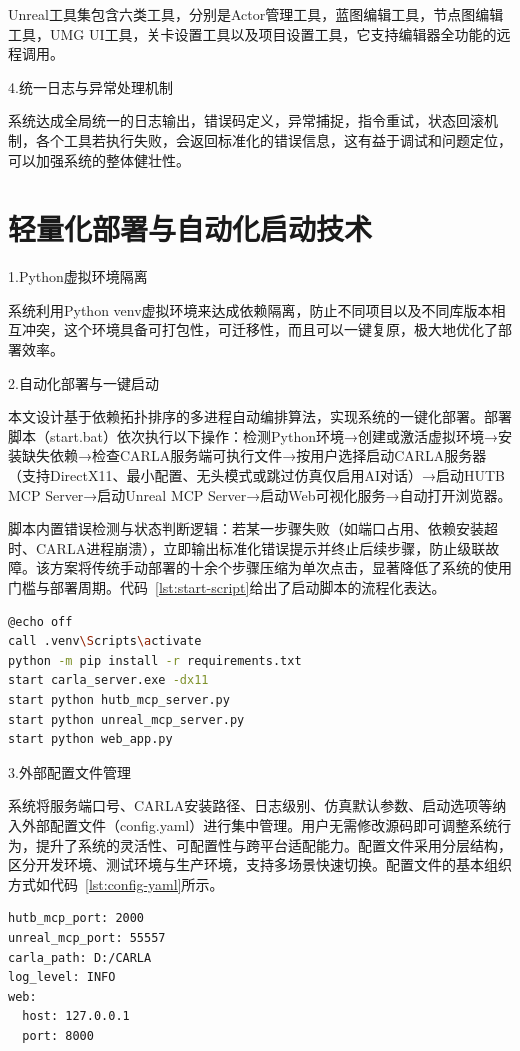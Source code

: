 Unreal工具集包含六类工具，分别是Actor管理工具，蓝图编辑工具，节点图编辑工具，UMG
UI工具，关卡设置工具以及项目设置工具，它支持编辑器全功能的远程调用。

4.统一日志与异常处理机制

系统达成全局统一的日志输出，错误码定义，异常捕捉，指令重试，状态回滚机制，各个工具若执行失败，会返回标准化的错误信息，这有益于调试和问题定位，可以加强系统的整体健壮性。

\section{轻量化部署与自动化启动技术}

1.Python虚拟环境隔离

系统利用Python
venv虚拟环境来达成依赖隔离，防止不同项目以及不同库版本相互冲突，这个环境具备可打包性，可迁移性，而且可以一键复原，极大地优化了部署效率。

2.自动化部署与一键启动

本文设计基于依赖拓扑排序的多进程自动编排算法，实现系统的一键化部署。部署脚本（start.bat）依次执行以下操作：检测Python环境→创建或激活虚拟环境→安装缺失依赖→检查CARLA服务端可执行文件→按用户选择启动CARLA服务器（支持DirectX11、最小配置、无头模式或跳过仿真仅启用AI对话）→启动HUTB
MCP Server→启动Unreal MCP Server→启动Web可视化服务→自动打开浏览器。

脚本内置错误检测与状态判断逻辑：若某一步骤失败（如端口占用、依赖安装超时、CARLA进程崩溃），立即输出标准化错误提示并终止后续步骤，防止级联故障。该方案将传统手动部署的十余个步骤压缩为单次点击，显著降低了系统的使用门槛与部署周期。代码~\ref{lst:start-script}给出了启动脚本的流程化表达。

\begin{lstlisting}[style=hutbcode,language=bash,basicstyle=\ttfamily\tiny,numberstyle=\tiny\color{gray},aboveskip=1pt,belowskip=1pt,framesep=1pt,lineskip=-1pt,caption={一键启动脚本流程示例},label={lst:start-script}]
@echo off
call .venv\Scripts\activate
python -m pip install -r requirements.txt
start carla_server.exe -dx11
start python hutb_mcp_server.py
start python unreal_mcp_server.py
start python web_app.py
\end{lstlisting}

3.外部配置文件管理

系统将服务端口号、CARLA安装路径、日志级别、仿真默认参数、启动选项等纳入外部配置文件（config.yaml）进行集中管理。用户无需修改源码即可调整系统行为，提升了系统的灵活性、可配置性与跨平台适配能力。配置文件采用分层结构，区分开发环境、测试环境与生产环境，支持多场景快速切换。配置文件的基本组织方式如代码~\ref{lst:config-yaml}所示。

\begin{lstlisting}[style=hutbcode,language=bash,basicstyle=\ttfamily\tiny,numberstyle=\tiny\color{gray},aboveskip=1pt,belowskip=1pt,framesep=1pt,lineskip=-1pt,caption={config.yaml配置结构示例},label={lst:config-yaml}]
hutb_mcp_port: 2000
unreal_mcp_port: 55557
carla_path: D:/CARLA
log_level: INFO
web:
  host: 127.0.0.1
  port: 8000
\end{lstlisting}
